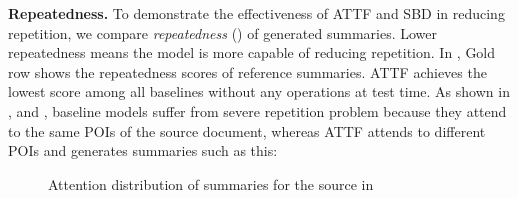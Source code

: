 \textbf{Repeatedness.}
To demonstrate the effectiveness of ATTF and SBD in reducing repetition, 
we compare \textit{repeatedness} () 
of generated summaries.
Lower repeatedness 
means the model is more capable of reducing repetition.
In , Gold row shows the repeatedness scores of
reference summaries. ATTF achieves the lowest
score among all baselines without any operations at test time. 
As shown in ,  and ,
baseline models suffer from severe repetition problem because they attend to the same POIs 
of the source document, whereas 
ATTF attends to different POIs and generates summaries 
such as this:


\begin{figure}[th!]
\centering
{}
\quad
{}
\quad
{}
\quad
{}
\quad
{}
\quad
{}
\caption{Attention distribution of summaries for the source in }
\label{fig:attn_maps}
\end{figure}

